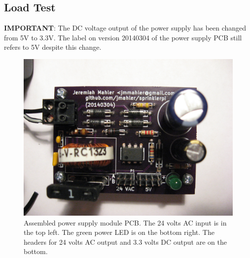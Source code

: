\documentclass{article}
\begin{document}
\subsection{Load Test}

\begin{framed}
\textbf{IMPORTANT}: The DC voltage output of the power supply has
been changed from 5V to 3.3V.
The label on version 20140304 of the power supply PCB still
refers to 5V despite this change.
\end{framed}

\begin{figure}[hbp!]
\begin{center}
\includegraphics[scale=0.15,angle=0]{img/power_pcb-assembled-02.jpg}
\end{center}
\caption{Assembled power supply module PCB.
The 24 volts AC input is in the top left.
The green power LED is on the bottom right.
The headers for 24 volts AC output and 3.3 volts DC
output are on the bottom.
}\label{fig:psm2}
\end{figure}
\end{document}
